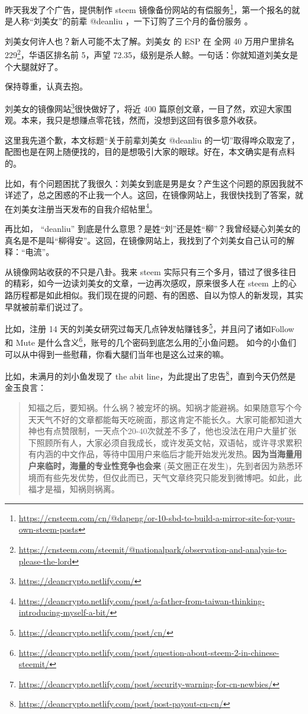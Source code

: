 \documentclass[]{ctexbook}
\renewcommand{\href}[2]{#2\footnote{\url{#1}}}
\begin{document}
昨天我发了个广告，\href{https://cnsteem.com/cn/@dapeng/or-10-sbd-to-build-a-mirror-site-for-your-own-steem-posts}{提供制作 steem 镜像备份网站的有偿服务}，第一个报名的就是人称``刘美女''的前辈 @deanliu ，一下订购了三个月的备份服务 。

刘美女何许人也？新人可能不太了解。刘美女 的 ESP 在 \href{https://cnsteem.com/steemit/@nationalpark/observation-and-analysis-to-please-the-lord}{全网 40 万用户里排名 229}，华语区排名前 5，声望 72.35，级别是杀人鲸。一句话：你就知道刘美女是个大腿就好了。

保持尊重，认真去抱。

\href{https://deancrypto.netlify.com/}{刘美女的镜像网站}很快做好了，将近 400 篇原创文章，一目了然，欢迎大家围观。本来，我只是想赚点零花钱，然而，没想到这回有很多意外收获。

这里我先道个歉，本文标题``关于前辈刘美女 @deanliu 的一切''取得哗众取宠了，配图也是在网上随便找的，目的是想吸引大家的眼球。好在，本文确实是有点料的。

比如，有个问题困扰了我很久：刘美女到底是男是女？产生这个问题的原因我就不详述了，总之困惑的不止我一个人。这回，在镜像网站上，我很快找到了答案，就在刘美女注册当天发布的\href{https://deancrypto.netlify.com/post/a-father-from-taiwan-thinking-introducing-myself-a-bit/}{自我介绍帖里}。

再比如， ``deanliu'' 到底是什么意思？是姓``刘''还是姓``柳''？我曾经疑心刘美女的真名是不是叫``柳得安''。这回，在镜像网站上，我找到了个刘美女自己认可的解释：``电流''。

从镜像网站收获的不只是八卦。我来 steem 实际只有三个多月，错过了很多往日的精彩，如今一边读刘美女的文章，一边再次感叹，原来很多人在 steem 上的心路历程都是如此相似。我们现在提的问题、有的困惑、自以为惊人的新发现，其实早就被前辈们说过了。

比如，注册 14 天的刘美女\href{https://deancrypto.netlify.com/post/cn/}{研究过每天几点钟发帖赚钱多}，并且问了诸如\href{https://deancrypto.netlify.com/post/question-about-steem-2-in-chinese-steemit/}{Follow 和 Mute 是什么含义}，\href{https://deancrypto.netlify.com/post/security-warning-for-cn-newbies/}{账号的几个密码到底怎么用的}小鱼问题。 如今的小鱼们可以从中得到一些慰藉，你看大腿们当年也是这么过来的嘛。

比如，未满月的刘小鱼发现了 the abit line，为此提出了\href{https://deancrypto.netlify.com/post/post-payout-cn-cn/}{忠告}，直到今天仍然是金玉良言：

\begin{quote}
知福之后，要知祸。什么祸？被宠坏的祸。知祸才能避祸。如果随意写个今天天气不好的文章都能每天吃碗面，那这肯定不能长久。大家可能都知道大神也有点赞限制，一天点个20-40次就差不多了，他也没法在用户大量扩张下照顾所有人，大家必须自我成长，或许发英文帖，双语帖，或许寻求累积有内涵的中文作品，等待中国用户来临后才能开始发光发热。\textbf{因为当海量用户来临时，海量的专业性竞争也会来} (英文圈正在发生)，先到者因为熟悉环境而有些先发优势，但仅此而已，天气文章终究只能发到微博吧。如此，此福才是福，知祸则祸离。
\end{quote}
\end{document}
